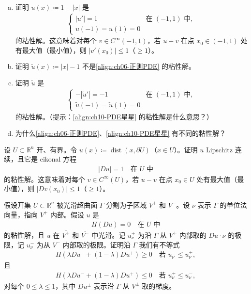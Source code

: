 \documentclass[../../main.tex]{subfiles}
\begin{document}
\begin{exercise}\label{exercise:ch10-距离函数粘性解}
\begin{enumerate}[(a)]
\item 证明 $u(x)\coloneqq 1-|x|$ 是
\begin{align}
\begin{cases}
|u'|=1 & \text{在 } (-1,1) \text{ 中},\\
u(-1)=u(1)=0
\end{cases}
\label{align:ch06-正则PDE}
\end{align}
的粘性解。这意味着对每个 $v\in C^\infty(-1,1)$，若 $u-v$ 在点 $x_0\in(-1,1)$ 处有最大值（最小值），则 $|v'(x_0)|\leqslant 1$（$\geqslant 1$）。
\item 证明 $\widetilde{u}(x)\coloneqq |x|-1$ 不是\eqref{align:ch06-正则PDE} 的粘性解。
\item 证明 $\widetilde{u}$ 是
\begin{align}
\begin{cases}
-|\widetilde{u}'|=-1 & \text{在 } (-1,1) \text{ 中},\\
\widetilde{u}(-1)=\widetilde{u}(1)=0
\end{cases}
\label{align:ch10-PDE星星}
\end{align}
的粘性解。（提示：\eqref{align:ch10-PDE星星} 的粘性解是什么意思？）
\item 为什么\eqref{align:ch06-正则PDE}、\eqref{align:ch10-PDE星星} 有不同的粘性解？
\end{enumerate}
\end{exercise}

\begin{exercise}\label{exercise:ch10-eikonal方程}
设 $U\subset\mathbb{R}^n$ 开、有界。令 $u(x)\coloneqq\operatorname{dist}(x,\partial U)$（$x\in U$）。证明 $u$ Lipschitz 连续，且它是 eikonal 方程
\begin{align*}
|Du|=1 \quad \text{在 } U \text{ 中}
\end{align*}
的粘性解。这意味着对每个 $v\in C^\infty(U)$，若 $u-v$ 在点 $x_0\in U$ 处有最大值（最小值），则 $|Dv(x_0)|\leqslant 1$（$\geqslant 1$）。
\end{exercise}

\begin{exercise}\label{exercise:ch10-间断面条件}
假设开集 $U\subset\mathbb{R}^n$ 被光滑超曲面 $\Gamma$ 分割为子区域 $V^+$ 和 $V^-$。设 $\nu$ 表示 $\Gamma$ 的单位法向量，指向 $V^+$ 内部。假设 $u$ 是
\begin{align*}
H(Du)=0 \quad \text{在 } U \text{ 中}
\end{align*}
的粘性解，且 $u$ 在 $\overline{V^+}$ 和 $\overline{V^-}$ 中光滑。记 $u_\nu^+$ 为沿 $\Gamma$ 从 $V^+$ 内部取的 $Du\cdot\nu$ 的极限，记 $u_\nu^-$ 为从 $V^-$ 内部取的极限。证明沿 $\Gamma$ 我们有不等式
\begin{align*}
H(\lambda Du^-+(1-\lambda)Du^+)\geqslant 0 \quad \text{若 } u_\nu^-\leqslant u_\nu^+,
\end{align*}
且
\begin{align*}
H(\lambda Du^-+(1-\lambda)Du^+)\leqslant 0 \quad \text{若 } u_\nu^+\leqslant u_\nu^-,
\end{align*}
对每个 $0\leqslant\lambda\leqslant 1$，其中 $Du^\pm$ 表示沿 $\Gamma$ 从 $V^\pm$ 取的梯度。
\end{exercise}
\end{document}
